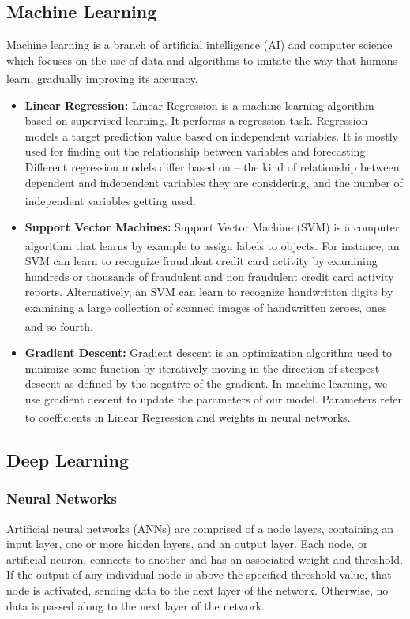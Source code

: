 \subsection{Machine Learning}
\hspace{\parindent}
Machine learning is a branch of artificial intelligence (AI) and computer science which focuses on the use of data and algorithms to imitate the way that humans learn, gradually improving its accuracy. \textsuperscript{\cite{ML-IBM}}

\begin{itemize}
  \item \textbf{Linear Regression:}
      Linear Regression is a machine learning algorithm based on supervised learning. It performs a regression task. Regression models a target prediction value based on independent variables. It is mostly used for finding out the relationship between variables and forecasting. Different regression models differ based on – the kind of relationship between dependent and independent variables they are considering, and the number of independent variables getting used. \textsuperscript{\cite{LR-GeeksForGeeks}}
  \item \textbf{Support Vector Machines:}
      Support Vector Machine (SVM) is a computer algorithm that learns by example to assign labels to objects. \textsuperscript{\cite{boser1992training}} For instance, an SVM can learn to recognize fraudulent credit card activity by examining hundreds or thousands of fraudulent and non fraudulent credit card activity reports. Alternatively, an SVM can learn to recognize handwritten digits by examining a large collection of scanned images of handwritten zeroes, ones and so fourth. \textsuperscript{\cite{noble2006support}}
  \item \textbf{Gradient Descent:}
      Gradient descent is an optimization algorithm used to minimize some function by iteratively moving in the direction of steepest descent as defined by the negative of the gradient. In machine learning, we use gradient descent to update the parameters of our model. Parameters refer to coefficients in Linear Regression and weights in neural networks. \textsuperscript{\cite{DG-ml-cheatsheet}}
\end{itemize}

\subsection{Deep Learning}
\subsubsection{Neural Networks}
\hspace{\parindent}
Artificial neural networks (ANNs) are comprised of a node layers, containing an input layer, one or more hidden layers, and an output layer. Each node, or artificial neuron, connects to another and has an associated weight and threshold. If the output of any individual node is above the specified threshold value, that node is activated, sending data to the next layer of the network. Otherwise, no data is passed along to the next layer of the network.

